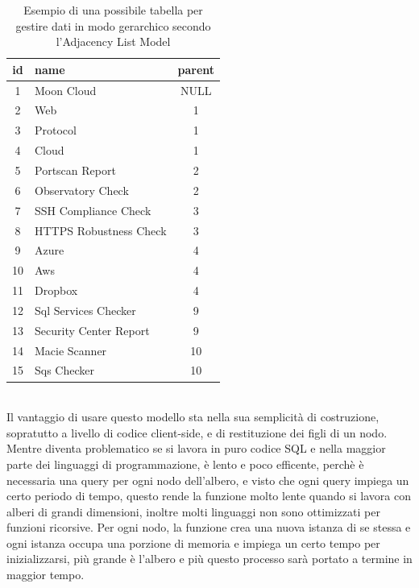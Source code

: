 \begin{table}[ht!]
\centering
\begin{tabular}[c]{| c | l | c |} 
	\hline
	id & name & parent \\ [0.5ex] 
	\hline
	\rowcolor{rootnodecell} 1 & Moon Cloud & NULL \\ [0.5ex] 
	\rowcolor{categorycell} 2 & Web & 1 \\ [0.5ex] 
	\rowcolor{categorycell} 3 & Protocol & 1 \\ [0.5ex] 
	\rowcolor{categorycell} 4 & Cloud & 1 \\ [0.5ex] 
	\rowcolor{evaluationcell} 5 & Portscan Report & 2 \\ [0.5ex] 
	\rowcolor{evaluationcell} 6 & Observatory Check & 2 \\ [0.5ex] 
	\rowcolor{evaluationcell} 7 & SSH Compliance Check & 3 \\ [0.5ex] 
	\rowcolor{evaluationcell} 8 & HTTPS Robustness Check & 3 \\ [0.5ex] 
	\rowcolor{categorycell} 9 & Azure & 4 \\ [0.5ex] 
	\rowcolor{categorycell} 10 & Aws & 4 \\ [0.5ex] 
	\rowcolor{categorycell} 11 & Dropbox & 4 \\ [0.5ex] 
	\rowcolor{evaluationcell} 12 & Sql Services Checker & 9 \\ [0.5ex] 
	\rowcolor{evaluationcell} 13 & Security Center Report & 9 \\ [0.5ex] 
	\rowcolor{evaluationcell} 14 & Macie Scanner & 10 \\ [0.5ex] 
	\rowcolor{evaluationcell} 15 & Sqs Checker & 10 \\ [0.5ex]
	\hline
\end{tabular}
\caption{Esempio di una possibile tabella per gestire dati in modo gerarchico secondo l'Adjacency List Model}
\label{table:adjacency_list_model_table}
\end{table}
\ \\
Il vantaggio di usare questo modello sta nella sua semplicità di costruzione, sopratutto a livello di codice client-side, 
e di restituzione dei figli di un nodo. Mentre diventa problematico se si lavora in puro codice SQL e nella maggior parte dei linguaggi 
di programmazione, è lento e poco efficente, perchè è necessaria una query per ogni nodo dell'albero, e visto che ogni query impiega 
un certo periodo di tempo, questo rende la funzione molto lente quando si lavora con alberi di grandi dimensioni, inoltre molti linguaggi 
non sono ottimizzati per funzioni ricorsive. Per ogni nodo, la funzione crea una nuova istanza di se stessa e ogni istanza occupa 
una porzione di memoria e impiega un certo tempo per inizializzarsi, più grande è l'albero e più questo processo sarà portato a termine 
in maggior tempo.


